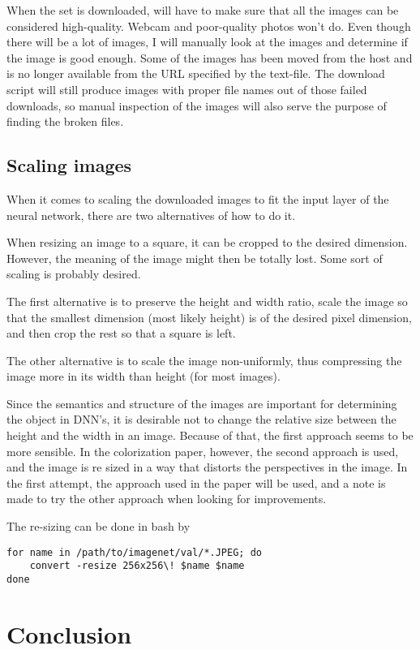 \documentclass{article}
\begin{document}
When the set is downloaded, will have to make sure that all the images can be considered high-quality. Webcam and poor-quality photos won't do. Even though there will be a lot of images, I will manually look at the images and determine if the image is good enough. Some of the images has been moved from the host and is no longer available from the URL specified by the text-file. The download script will still produce images with proper file names out of those failed downloads, so manual inspection of the images will also serve the purpose of finding the broken files. 

\subsection{Scaling images}
When it comes to scaling the downloaded images to fit the input layer of the neural network, there are two alternatives of how to do it. 

When resizing an image to a square, it can be cropped to the desired dimension. However, the meaning of the image might then be totally lost. Some sort of scaling is probably desired. 

The first alternative is to preserve the height and width ratio, scale the image so that the smallest dimension (most likely height) is of the desired pixel dimension, and then crop the rest so that a square is left. 

The other alternative is to scale the image non-uniformly, thus compressing the image more in its width than height (for most images). 

Since the semantics and structure of the images are important for determining the object in DNN's, it is desirable not to change the relative size between the height and the width in an image. Because of that, the first approach seems to be more sensible. In the colorization paper, however, the second approach is used, and the image is re sized in a way that distorts the perspectives in the image. In the first attempt, the approach used in the paper will be used, and a note is made to try the other approach when looking for improvements. 

The re-sizing can be done in bash by

\begin{lstlisting}
for name in /path/to/imagenet/val/*.JPEG; do
    convert -resize 256x256\! $name $name
done
\end{lstlisting}

\section{Conclusion}




\end{document}
